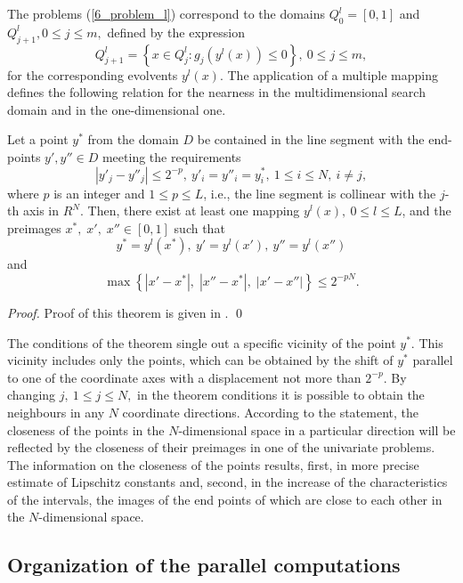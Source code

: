 The problems (\ref{6_problem_l}) correspond to the domains $Q_0^l=[0,1]$ and $Q_{j+1}^l, 0 \leq j \leq m,$ defined by the expression 
\[
Q_{j+1}^l = \left\{x \in Q_j^l:g_j(y^l(x))\leq 0\right\},\ 0\leq j\leq m,
\]
for the corresponding evolvents $y^l(x)$. The application of a multiple mapping defines the following relation for the nearness in the multidimensional search domain and in the one-dimensional one.

\begin{theorem}
Let a point $y^\ast$ from the domain $D$ be contained in the line segment with the end-points $y',y'' \in D$ meeting the requirements 
\[
\left|y'_j - y''_j\right|\leq 2^{-p},\ y'_i=y''_i=y^\ast_i, \ 1\leq i \leq N,\ i \neq j,
\]
where $p$ is an integer  and $1\leq p \leq L$, i.e., the line segment is collinear with the $j$-th axis in $R^N$. Then, there exist at least one mapping $y^l(x),\ 0\leq l\leq L$, and the preimages $x^\ast,\; x',\; x''\in [0,1]$ such that
\[
y^\ast = y^l(x^\ast),\ y'=y^l(x'),\ y'' = y^l(x'')
\]
and
\[
\max \left\{ \left|x'-x^\ast\right|,\; \left|x''-x^\ast\right|,\; \left|x'-x''\right|\right\} \leq 2^{-pN}.
\]
\end{theorem}
\begin{proof}
Proof of this theorem is given in \cite{6_Strongin2000}.
\qed
\end{proof}

The conditions of the theorem single out a specific vicinity of the point $y^\ast$. This vicinity includes only the points, which can be obtained by the shift of $y^\ast$ parallel to one of the coordinate axes with a displacement not more than $2^{-p}$. By changing  $j,\ 1\leq j\leq N,$ in the theorem conditions it is possible to obtain the neighbours in any $N$ coordinate directions. According to the statement, the closeness of the points in the $N$-dimensional space in a particular direction will be reflected by the closeness of their preimages in one of the univariate problems. The information on the closeness of the points results, first, in more precise estimate of Lipschitz constants and, second, in the increase of the characteristics of the intervals, the images of the end points of which are close to each other in the $N$-dimensional space.

\subsection{Organization of the parallel computations}


